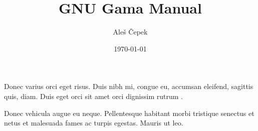 \documentclass[a4paper]{article}
\title{GNU Gama Manual}
\author{Aleš Čepek}
\date{\today}
\begin{document}
\maketitle

\noindent Donec varius orci eget risus. Duis nibh mi, congue eu, accumsan
eleifend, sagittis quis, diam. Duis eget orci sit amet orci dignissim
rutrum \cite{gama-manual}.

Donec vehicula augue eu neque. Pellentesque habitant morbi
\cite{gama-manual} tristique senectus et netus et malesuada fames ac
turpis egestas. Mauris ut leo.


\printbibliography[heading=subbibliography]
\end{document}
